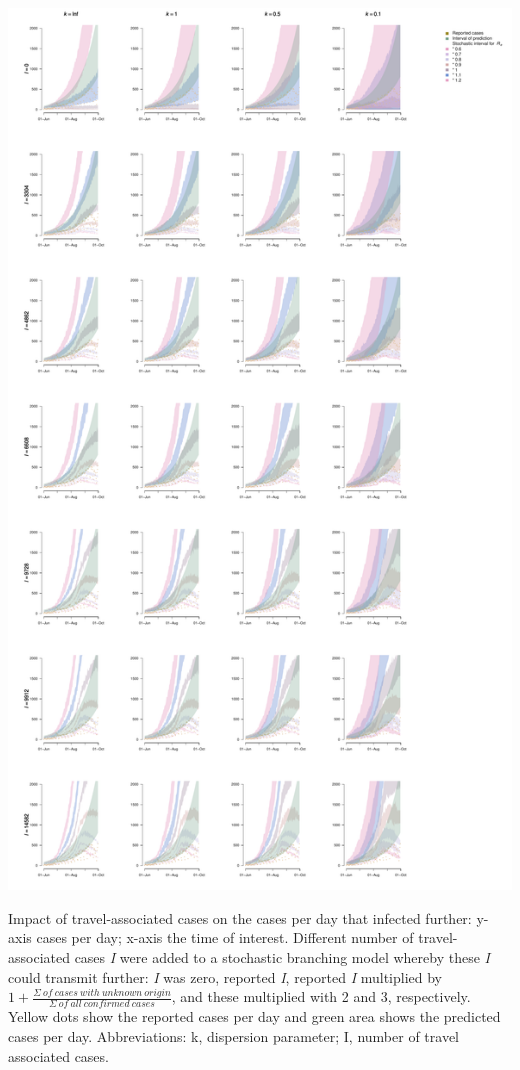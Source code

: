 \documentclass[10pt, a4paper, twoside]{article}
\begin{document}
\begin{suppfigure}[h]
\centering
\includegraphics[scale=0.3]{sim_cases_d_imports_infect_2021-02-24.pdf}
\caption{Impact of travel-associated cases on the cases per day that infected further: y-axis cases per day; x-axis the time of interest. Different number of travel-associated cases \emph{I} were added to a stochastic branching model whereby these \emph{I} could transmit further: \emph{I} was zero, reported \emph{I}, reported \emph{I} multiplied by $1+ \frac{\Sigma ~of ~cases ~with ~unknown ~origin }{\Sigma ~of ~all ~confirmed ~cases}$, and these multiplied with 2 and 3, respectively. Yellow dots show the reported cases per day and green area shows the predicted cases per day. Abbreviations: k, dispersion parameter; I, number of travel associated cases.}
\end{suppfigure}
\end{document}
